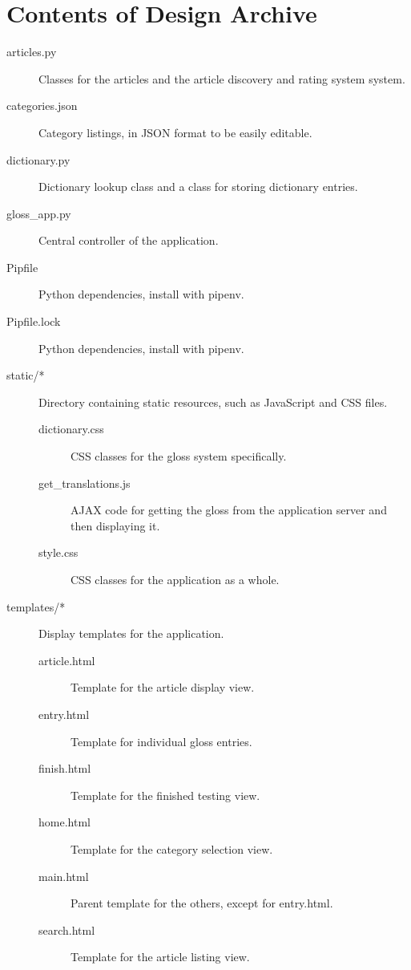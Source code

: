 \chapter{Contents of Design Archive}
\begin{description}
	\item[articles.py] Classes for the articles and the article discovery and rating system system.
	
	\item[categories.json] Category listings, in JSON format to be easily editable.
	
	\item[dictionary.py] Dictionary lookup class and a class for storing dictionary entries.
	
	\item[gloss\_app.py] Central controller of the application.
	
	\item[Pipfile] Python dependencies, install with pipenv.
	
	\item[Pipfile.lock] Python dependencies, install with pipenv.
	
	\item[static/*] Directory containing static resources, such as JavaScript and CSS files. 
		\begin{description}
			\item[dictionary.css] CSS classes for the gloss system specifically.
			
			\item[get\_translations.js] AJAX code for getting the gloss from the application server and then displaying it.
			
			\item[style.css] CSS classes for the application as a whole.
		\end{description}
	
	\item[templates/*] Display templates for the application.
		\begin{description}
			\item[article.html] Template for the article display view.
			
			\item[entry.html] Template for individual gloss entries.
			
			\item[finish.html] Template for the finished testing view.
			
			\item[home.html] Template for the category selection view.
			
			\item[main.html] Parent template for the others, except for entry.html.
			
			\item[search.html] Template for the article listing view. 
		\end{description}
	

\end{description}